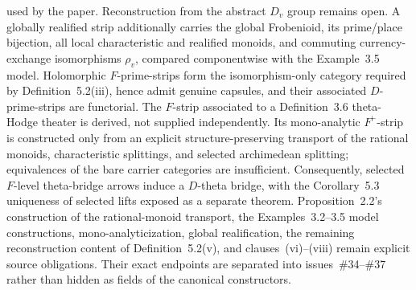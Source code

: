 \begin{definition}
  used by the paper.  Reconstruction from the abstract \(D_v\) group remains
  open.
  A globally realified strip additionally carries the global Frobenioid,
  its prime/place bijection, all local characteristic and realified monoids,
  and commuting currency-exchange isomorphisms \(\rho_v\), compared
  componentwise with the Example~3.5 model.
  Holomorphic \(F\)-prime-strips form the isomorphism-only category required
  by Definition~5.2(iii), hence admit genuine capsules, and their associated
  \(D\)-prime-strips are functorial.  The \(F\)-strip associated to a
  Definition~3.6 theta-Hodge theater is derived, not supplied independently.
  Its mono-analytic \(F^\vdash\)-strip is constructed only from an explicit
  structure-preserving transport of the rational monoids, characteristic
  splittings, and selected archimedean splitting; equivalences of the bare
  carrier categories are insufficient.
  Consequently, selected \(F\)-level theta-bridge arrows induce a
  \(D\)-theta bridge, with the Corollary~5.3 uniqueness of selected lifts
  exposed as a separate theorem.  Proposition~2.2's construction of the
  rational-monoid transport, the Examples~3.2--3.5 model constructions,
  mono-analyticization, global realification, the remaining reconstruction
  content of Definition~5.2(v), and clauses~(vi)--(viii) remain explicit
  source obligations.  Their exact endpoints are separated into
  issues~\#34--\#37 rather than hidden as fields of the canonical
  constructors.
\end{definition}

